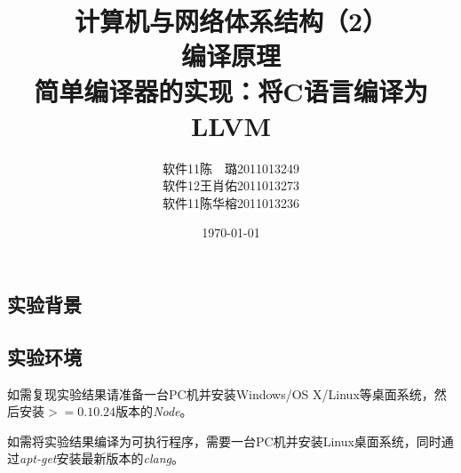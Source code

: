 \documentclass[a4paper]{article}
\begin{document}
\begin{CJK*}{UTF8}{gbsn}
    \CJKindent
    \setlength{\parindent}{2em} %

    \pagestyle{fancy}

    \title{\huge{计算机与网络体系结构（2）}\\\Large{编译原理}\\{\large 简单编译器的实现：将C语言编译为LLVM}}
    \author{
    软件11\hspace{10pt}陈　璐\hspace{10pt}2011013249\\
    软件12\hspace{10pt}王肖佑\hspace{10pt}2011013273\\
    软件11\hspace{10pt}陈华榕\hspace{10pt}2011013236
    }
    \date{\today}
    \maketitle
    \tableofcontents
    \newpage

    \section{实验背景}
    \subsection{实验环境}
    如需复现实验结果请准备一台PC机并安装Windows/OS X/Linux等桌面系统，然后安装$>=0.10.24$版本的\textit{Node}。
    \par 如需将实验结果编译为可执行程序，需要一台PC机并安装Linux桌面系统，同时通过\textit{apt-get}安装最新版本的\textit{clang}。


\end{CJK*}
\end{document}
